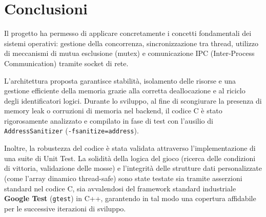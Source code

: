 \documentclass[11pt, a4paper]{article}
\begin{document}
\newpage
\section{Conclusioni}
Il progetto ha permesso di applicare concretamente i concetti fondamentali dei sistemi operativi: gestione della concorrenza, sincronizzazione tra thread, utilizzo di meccanismi di mutua esclusione (mutex) e comunicazione IPC (Inter-Process Communication) tramite socket di rete. 

L'architettura proposta garantisce stabilità, isolamento delle risorse e una gestione efficiente della memoria grazie alla corretta deallocazione e al riciclo degli identificatori logici. Durante lo sviluppo, al fine di scongiurare la presenza di memory leak o corruzioni di memoria nel backend, il codice C è stato rigorosamente analizzato e compilato in fase di test con l'ausilio di \texttt{AddressSanitizer} (\texttt{-fsanitize=address}).

Inoltre, la robustezza del codice è stata validata attraverso l'implementazione di una suite di Unit Test. La solidità della logica del gioco (ricerca delle condizioni di vittoria, validazione delle mosse) e l'integrità delle strutture dati personalizzate (come l'array dinamico thread-safe) sono state testate sia tramite asserzioni standard nel codice C, sia avvalendosi del framework standard industriale \textbf{Google Test} (\texttt{gtest}) in C++, garantendo in tal modo una copertura affidabile per le successive iterazioni di sviluppo.
\end{document}
